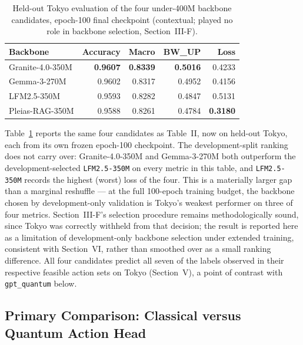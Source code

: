 \begin{table}[!t]
\caption{Held-out Tokyo evaluation of the four under-400M backbone candidates, epoch-100 final checkpoint (contextual; played no role in backbone selection, Section~III-F).}
\label{tab:backbone-survey}
\centering
\begin{tabular}{lrrrr}
\hline
Backbone & Accuracy & Macro & BW\_UP & Loss \\
\hline
Granite-4.0-350M   & \textbf{0.9607} & \textbf{0.8339} & \textbf{0.5016} & 0.4233 \\
Gemma-3-270M       & 0.9602 & 0.8317 & 0.4952 & 0.4156 \\
LFM2.5-350M        & 0.9593 & 0.8282 & 0.4847 & 0.5131 \\
Pleias-RAG-350M    & 0.9588 & 0.8261 & 0.4784 & \textbf{0.3180} \\
\hline
\end{tabular}
\end{table}

Table~\ref{tab:backbone-survey} reports the same four candidates as Table~II, now on held-out Tokyo, each from its own frozen epoch-100 checkpoint. The development-split ranking does not carry over: Granite-4.0-350M and Gemma-3-270M both outperform the development-selected \texttt{LFM2.5-350M} on every metric in this table, and \texttt{LFM2.5-350M} records the highest (worst) loss of the four. This is a materially larger gap than a marginal reshuffle --- at the full 100-epoch training budget, the backbone chosen by development-only validation is Tokyo's weakest performer on three of four metrics. Section~III-F's selection procedure remains methodologically sound, since Tokyo was correctly withheld from that decision; the result is reported here as a limitation of development-only backbone selection under extended training, consistent with Section~VI, rather than smoothed over as a small ranking difference. All four candidates predict all seven of the labels observed in their respective feasible action sets on Tokyo (Section~V), a point of contrast with \texttt{gpt\_quantum} below.

\subsection{Primary Comparison: Classical versus Quantum Action Head}


